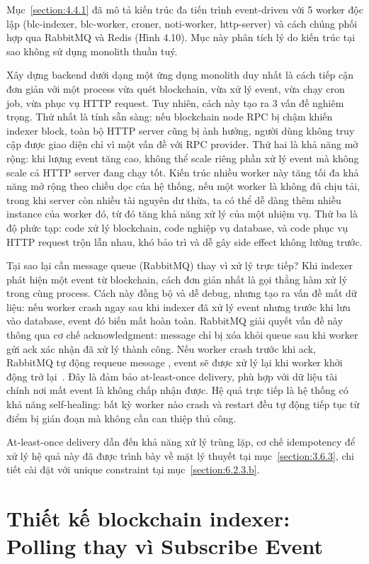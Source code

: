 \documentclass[../DoAn.tex]{subfiles}
\begin{document}
Mục~\ref{section:4.4.1} đã mô tả kiến trúc đa tiến trình event-driven với 5 worker độc lập (blc-indexer, blc-worker, croner, noti-worker, http-server) và cách chúng phối hợp qua RabbitMQ và Redis (Hình 4.10). Mục này phân tích lý do kiến trúc tại sao không sử dụng monolith thuần tuý.

Xây dựng backend dưới dạng một ứng dụng monolith duy nhất là cách tiếp cận đơn giản với một process vừa quét blockchain, vừa xử lý event, vừa chạy cron job, vừa phục vụ HTTP request. Tuy nhiên, cách này tạo ra 3 vấn đề nghiêm trọng. Thứ nhất là tính sẵn sàng: nếu blockchain node RPC bị chậm khiến indexer block, toàn bộ HTTP server cũng bị ảnh hưởng, người dùng không truy cập được giao diện chỉ vì một vấn đề với RPC provider. Thứ hai là khả năng mở rộng: khi lượng event tăng cao, không thể scale riêng phần xử lý event mà không scale cả HTTP server đang chạy tốt. Kiến trúc nhiều worker này tăng tối đa khả năng mở rộng theo chiều dọc của hệ thống, nếu một worker là không đủ chịu tải, trong khi server còn nhiều tài nguyên dư thừa, ta có thể dễ dàng thêm nhiều instance của worker đó, từ đó tăng khả năng xử lý của một nhiệm vụ. Thứ ba là độ phức tạp: code xử lý blockchain, code nghiệp vụ database, và code phục vụ HTTP request trộn lẫn nhau, khó bảo trì và dễ gây side effect không lường trước.

Tại sao lại cần message queue (RabbitMQ) thay vì xử lý trực tiếp? Khi indexer phát hiện một event từ blockchain, cách đơn giản nhất là gọi thẳng hàm xử lý trong cùng process. Cách này đồng bộ và dễ debug, nhưng tạo ra vấn đề mất dữ liệu: nếu worker crash ngay sau khi indexer đã xử lý event nhưng trước khi lưu vào database, event đó biến mất hoàn toàn. RabbitMQ giải quyết vấn đề này thông qua cơ chế acknowledgment: message chỉ bị xóa khỏi queue sau khi worker gửi ack xác nhận đã xử lý thành công. Nếu worker crash trước khi ack, RabbitMQ tự động requeue message , event sẽ được xử lý lại khi worker khởi động trở lại~\cite{RabbitMQDocs}. Đây là đảm bảo at-least-once delivery, phù hợp với dữ liệu tài chính nơi mất event là không chấp nhận được. Hệ quả trực tiếp là hệ thống có khả năng self-healing: bất kỳ worker nào crash và restart đều tự động tiếp tục từ điểm bị gián đoạn mà không cần can thiệp thủ công.

At-least-once delivery dẫn đến khả năng xử lý trùng lặp, cơ chế idempotency để xử lý hệ quả này đã được trình bày về mặt lý thuyết tại mục~\ref{section:3.6.3}, chi tiết cài đặt với unique constraint tại mục~\ref{section:6.2.3.b}.

\section{Thiết kế blockchain indexer: Polling thay vì Subscribe Event}
\label{section:5.5}
\end{document}
